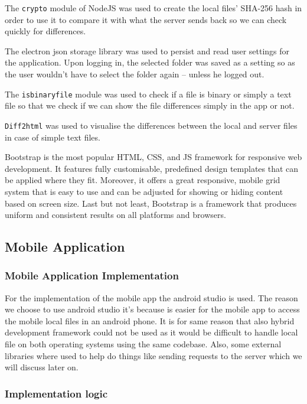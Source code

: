\documentclass[11pt]{article}
\begin{document}
The {\tt crypto} module \cite{crypto:19} of NodeJS was used to create the local files' SHA-256 hash in order to use it to compare it with what the server sends back so we can check quickly for differences.

The electron json storage library \cite{electron-json-storage:19} was used to persist and read user settings for the application. Upon logging in, the selected folder was saved as a setting so as the user wouldn't have to select the folder again – unless he logged out.

The {\tt isbinaryfile} module \cite{isbinaryfile:19} was used to check if a file is binary or simply a text file so that we check if we can show the file differences simply in the app or not.

{\tt Diff2html} \cite{diff2html:19} was used to visualise the differences between the local and server files in case of simple text files.

Bootstrap \cite{bootstrap:19} is the most popular HTML, CSS, and JS framework for responsive web development. It features fully customisable, predefined design templates that can be applied where they fit. Moreover, it offers a great responsive, mobile grid system that is easy to use and can be adjusted for showing or hiding content based on screen size. Last but not least, Bootstrap is a framework that produces uniform and consistent results on all platforms and browsers.

\subsection{Mobile Application}

\subsubsection*{Mobile Application Implementation}

For the implementation of the mobile app the android studio \cite{androidstudio:19} is used. The reason we choose to use android studio it's because is easier for the mobile app to access the mobile local files in an android phone. It is for same reason that also hybrid development framework could not be used as it would be difficult to handle local file on both operating systems using the same codebase. Also, some external libraries where used to help do things like sending requests to the server which we will discuss later on.

\subsubsection*{Implementation logic}
\end{document}
